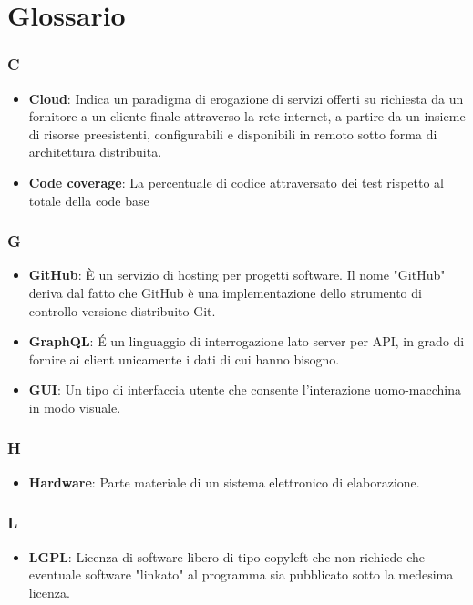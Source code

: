 \appendix

\section{Glossario}

\subsubsection{C}
\begin{itemize}
	\item \textbf{Cloud}: Indica un paradigma di erogazione di servizi offerti su richiesta da un fornitore a un cliente finale attraverso la rete internet, a partire da un insieme di risorse preesistenti, configurabili e disponibili in remoto sotto forma di architettura distribuita. 
	\item \textbf{Code coverage}: La percentuale di codice attraversato dei test rispetto al totale della code base
\end{itemize}

\subsubsection{G}
\begin{itemize}
	\item \textbf{GitHub}: È un servizio di hosting per progetti software. Il nome "GitHub" deriva dal fatto che
GitHub è una implementazione dello strumento di controllo versione distribuito Git.
\item \textbf{GraphQL}: É un linguaggio di interrogazione lato server per API, in grado di fornire ai client unicamente i dati di cui hanno bisogno.
\item \textbf{GUI}: Un tipo di interfaccia utente che consente l'interazione uomo-macchina in modo visuale. 
\end{itemize}

\subsubsection{H}
\begin{itemize}
	\item \textbf{Hardware}: Parte materiale di un sistema elettronico di elaborazione.
\end{itemize}

\subsubsection{L}
\begin{itemize}
\item \textbf{LGPL}: Licenza di software libero di tipo copyleft che non richiede che eventuale software "linkato" al programma sia pubblicato sotto la medesima licenza.
\end{itemize}

